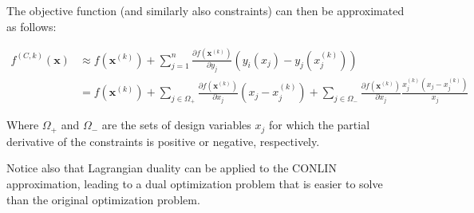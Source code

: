The objective function (and similarly also constraints) can then be approximated as follows:


\begin{equation}
    \begin{aligned}
        f^{(C, k)}(\bm{x}) & \approx f(\bm{x}^{(k)}) + \sum_{j = 1}^{n} \frac{\partial f(\bm{x}^{(k)})}{\partial y_j} \left( y_i(x_j) - y_j(x_j^{(k)}) \right)                                                                                      \\
                           & = f(\bm{x}^{(k)}) + \sum_{j \in \Omega_+} \frac{\partial f(\bm{x}^{(k)})}{\partial x_j} (x_j - x_j^{(k)}) + \sum_{j \in \Omega_-} \frac{\partial f(\bm{x}^{(k)})}{\partial x_j} \frac{x_j^{(k)}(x_j - x_j^{(k)})}{x_j}
    \end{aligned}
    \label{eq:conlin_approximation}
\end{equation}

Where $\Omega_+$ and $\Omega_-$ are the sets of design variables $x_j$ for which the partial derivative of the constraints is positive or negative, respectively.

Notice also that Lagrangian duality can be applied to the CONLIN approximation, leading to a dual optimization problem that is easier to solve than the original optimization problem.

